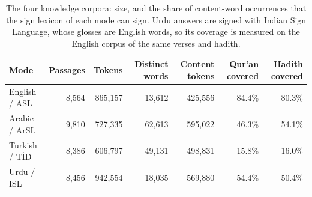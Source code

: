 \begin{table}[ht]
\centering\small
\caption{The four knowledge corpora: size, and the share of content-word occurrences that the sign lexicon of
each mode can sign. Urdu answers are signed with Indian Sign Language, whose glosses are English words, so its
coverage is measured on the English corpus of the same verses and hadith.}
\label{tab:eda_corpora}
\begin{tabular}{l r r r r r r}
\toprule
Mode & Passages & Tokens & Distinct words & Content tokens & Qur'an covered & Hadith covered \\
\midrule
English / ASL & 8,564 & 865,157 & 13,612 & 425,556 & 84.4\% & 80.3\% \\
Arabic / ArSL & 9,810 & 727,335 & 62,613 & 595,022 & 46.3\% & 54.1\% \\
Turkish / T\.{I}D & 8,386 & 606,797 & 49,131 & 498,831 & 15.8\% & 16.0\% \\
Urdu / ISL & 8,456 & 942,554 & 18,035 & 569,880 & 54.4\% & 50.4\% \\
\bottomrule
\end{tabular}
\end{table}

